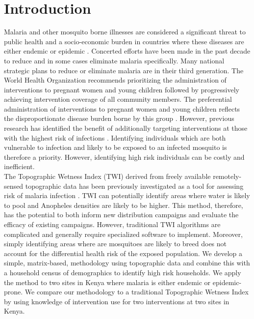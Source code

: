 \documentclass[10pt,letterpaper]{article}\usepackage[]{graphicx}\usepackage[]{color}
\begin{document}
\linenumbers

\section*{Introduction}
Malaria and other mosquito borne illnesses are considered a significant threat to public health and a socio-economic burden in countries where these diseases are either endemic or epidemic \cite{Crouch}. Concerted efforts have been made in the past decade to reduce and in some cases eliminate malaria specifically. Many national strategic plans to reduce or eliminate malaria are in their third generation.  The World Health Organization recommends prioritizing the administration of interventions to pregnant women and young children followed by progressively achieving intervention coverage of all community members. The preferential administration of interventions to pregnant women and young children reflects the disproportionate disease burden borne by this group \cite{Bousema2012}. However,  previous research has identified the benefit of additionally targeting interventions at those with the highest risk of infections \cite{SchantzDunn2009}. Identifying individuals which are both vulnerable to infection and likely to be exposed to an infected mosquito is therefore a priority.  However, identifying high risk individuals can be costly and inefficient.\\

The Topographic Wetness Index (TWI) \cite{Beven1979} derived from freely available remotely-sensed topographic data has been previously investigated as a tool for assessing risk of malaria infection \cite{Cohen2008,Cohen2010}. TWI can potentially identify areas where water is likely to pool and Anopheles densities are likely to be higher. This method, therefore, has the potential to both inform new distribution campaigns and evaluate the efficacy of existing campaigns.  However, traditional TWI algorithms are complicated and generally require specialized software to implement.  Moreover, simply identifying areas where are mosquitoes are likely to breed does not account for the differential health risk of the exposed population.  We develop a simple, matrix-based, methodology using topographic data and combine this with a household census of demographics to identify high risk households.  We apply the method to two sites in Kenya where malaria is either endemic or epidemic-prone.  We compare our methodology to a traditional Topographic  Wetness Index by using knowledge of intervention use for two interventions at two sites in Kenya. \\%
\end{document}
